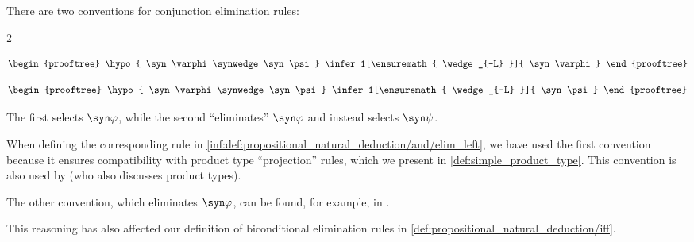 \begin{remark}\label{rem:conjunction_elimination_order}
  There are two conventions for conjunction elimination rules:
  \begin{paracol}{2}
    \begin{leftcolumn}
      \ParacolAlignmentHack
      \begin{equation*}
        \begin{prooftree}
          \hypo{ \syn\varphi \synwedge \syn\psi }
          \infer1[\ensuremath{ \wedge_{-L} }]{ \syn\varphi }
        \end{prooftree}
      \end{equation*}
    \end{leftcolumn}

    \begin{rightcolumn}
      \ParacolAlignmentHack
      \begin{equation*}
        \begin{prooftree}
          \hypo{ \syn\varphi \synwedge \syn\psi }
          \infer1[\ensuremath{ \wedge_{-L} }]{ \syn\psi }
        \end{prooftree}
      \end{equation*}
    \end{rightcolumn}
  \end{paracol}

  The first selects \( \syn\varphi \), while the second \enquote{eliminates} \( \syn\varphi \) and instead selects \( \syn\psi \).

  When defining the corresponding rule in \ref{inf:def:propositional_natural_deduction/and/elim_left}, we have used the first convention because it ensures compatibility with product type \enquote{projection} rules, which we present in \cref{def:simple_product_type}. This convention is also used by \textcite[fig. 2.5]{Mimram2020ProgramEqualsProof} (who also discusses product types).

  The other convention, which eliminates \( \syn\varphi \), can be found, for example, in \cite[def. 2.1.1]{TroelstraSchwichtenberg2000BasicProofTheory}.
\end{remark}
\begin{comments}
  \item This reasoning has also affected our definition of biconditional elimination rules in \cref{def:propositional_natural_deduction/iff}.
\end{comments}

